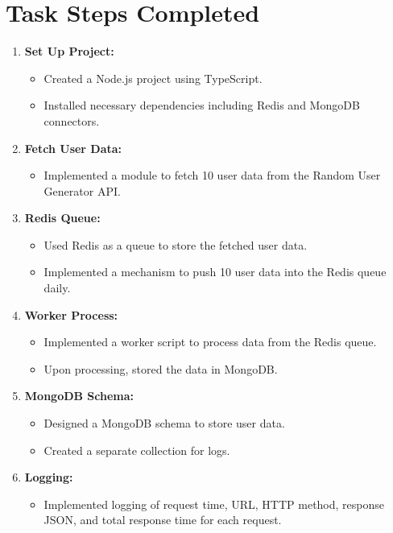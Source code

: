 \documentclass{article}
\begin{document}
	\section*{Task Steps Completed}
	\begin{enumerate}[label=\arabic*.]
		\item \textbf{Set Up Project:}
		\begin{itemize}[label=-]
			\item Created a Node.js project using TypeScript.
			\item Installed necessary dependencies including Redis and MongoDB connectors.
		\end{itemize}
		
		\item \textbf{Fetch User Data:}
		\begin{itemize}[label=-]
			\item Implemented a module to fetch 10 user data from the Random User Generator API.
		\end{itemize}
		
		\item \textbf{Redis Queue:}
		\begin{itemize}[label=-]
			\item Used Redis as a queue to store the fetched user data.
			\item Implemented a mechanism to push 10 user data into the Redis queue daily.
		\end{itemize}
		
		\item \textbf{Worker Process:}
		\begin{itemize}[label=-]
			\item Implemented a worker script to process data from the Redis queue.
			\item Upon processing, stored the data in MongoDB.
		\end{itemize}
		
		\item \textbf{MongoDB Schema:}
		\begin{itemize}[label=-]
			\item Designed a MongoDB schema to store user data.
			\item Created a separate collection for logs.
		\end{itemize}
		
		\item \textbf{Logging:}
		\begin{itemize}[label=-]
			\item Implemented logging of request time, URL, HTTP method, response JSON, and total response time for each request.
		\end{itemize}
		

\end{enumerate}
\end{document}

